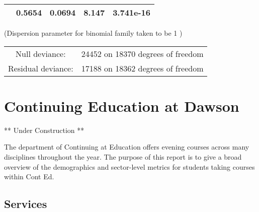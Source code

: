 \documentclass[]{book}
\theoremstyle{definition}
\theoremstyle{definition}
\theoremstyle{remark}
\begin{document}
\begin{longtable}[]{@{}ccccc@{}}
\begin{minipage}[t]{0.30\columnwidth}
\end{minipage} & \begin{minipage}[t]{0.13\columnwidth}\centering\strut
0.5654\strut
\end{minipage} & \begin{minipage}[t]{0.16\columnwidth}\centering\strut
0.0694\strut
\end{minipage} & \begin{minipage}[t]{0.12\columnwidth}\centering\strut
8.147\strut
\end{minipage} & \begin{minipage}[t]{0.12\columnwidth}\centering\strut
3.741e-16\strut
\end{minipage}\tabularnewline
\bottomrule
\end{longtable}

(Dispersion parameter for binomial family taken to be 1 )

\begin{longtable}[]{@{}cl@{}}
\toprule
\begin{minipage}[t]{0.25\columnwidth}\centering\strut
Null deviance:\strut
\end{minipage} & \begin{minipage}[t]{0.35\columnwidth}\raggedright\strut
24452 on 18370 degrees of freedom\strut
\end{minipage}\tabularnewline
\begin{minipage}[t]{0.25\columnwidth}\centering\strut
Residual deviance:\strut
\end{minipage} & \begin{minipage}[t]{0.35\columnwidth}\raggedright\strut
17188 on 18362 degrees of freedom\strut
\end{minipage}\tabularnewline
\bottomrule
\end{longtable}

\hypertarget{conted}{\chapter{Continuing Education at
Dawson}\label{conted}}

** Under Construction **

The department of Continuing at Education offers evening courses across
many disciplines throughout the year. The purpose of this report is to
give a broad overview of the demographics and sector-level metrics for
students taking courses within Cont Ed.

\section{Services}\label{services}
\end{document}
